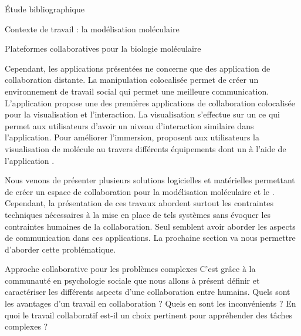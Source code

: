 \documentclass[myfrancais,ngerman,english,frenchb]{mythesis}
\begin{document}
\begin{mychapter}{Étude bibliographique}
\begin{mysection}{Contexte de travail : la modélisation moléculaire}
\begin{mysubsection}{Plateformes collaboratives pour la biologie moléculaire}
				\begin{myfigure}
				\end{myfigure}

				Cependant, les applications présentées ne concerne que des application de collaboration distante.
				La manipulation colocalisée permet de créer un environnement de travail social qui permet une meilleure communication.
				L'application \myPaulingWorld {} propose une des premières applications de collaboration colocalisée pour la visualisation et l'interaction.
				La visualisation s'effectue sur un \myWorkbench ce qui permet aux utilisateurs d'avoir un niveau d'interaction similaire dans l'application.
				Pour améliorer l'immersion,  proposent aux utilisateurs la visualisation de molécule au travers différents équipements dont un \myCAVE à l'aide de l'application \myDIVERSE.

				Nous venons de présenter plusieurs solutions logicielles et matérielles permettant de créer un espace de collaboration pour la modélisation moléculaire et le .
				Cependant, la présentation de ces travaux abordent surtout les contraintes techniques nécessaires à la mise en place de tels systèmes sans évoquer les contraintes humaines de la collaboration.
				Seul  semblent avoir aborder les aspects de communication dans ces applications.
				La prochaine section va nous permettre d'aborder cette problématique.
			\end{mysubsection}
		\end{mysection}
		\begin{mysection}{Approche collaborative pour les problèmes complexes}
			C'est grâce à la communauté en psychologie sociale que nous allons à présent définir et caractériser les différents aspects d'une collaboration entre humains.
			Quels sont les avantages d'un travail en collaboration ?
			Quels en sont les inconvénients ?
			En quoi le travail collaboratif est-il un choix pertinent pour appréhender des tâches complexes ?


\end{mysection}
\end{mychapter}
\end{document}

